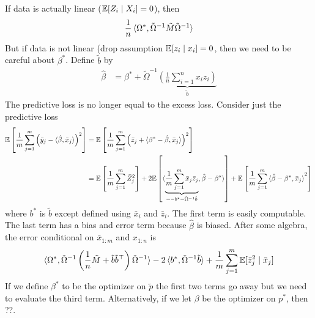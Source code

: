 If data is actually linear ($\mathbb{E}[Z_i \mid X_i] = 0$), then
\begin{align}
  \frac{1}{n} \braket{\Omega^*, \tilde{\Omega}^{-1} \tilde{M} \tilde{\Omega}^{-1}}
\end{align} 
But if data is not linear (drop assumption $\mathbb{E}[z_i \mid x_i] = 0$,
then we need to be careful about $\beta^*$. Define $\tilde{b}$ by
\begin{align}
  \hat{\beta} &=
  \beta^* + \tilde{\Omega}^{-1} \underbrace{\left( \frac{1}{n}  \sum_{i=1}^n x_i z_i \right)}_{\tilde{b}}
\end{align}
The predictive loss is no longer equal to the excess loss.
Consider just the predictive loss
\begin{align}
  \mathbb{E}\left[
    \frac{1}{m}  \sum_{j=1}^m \left(
      \bar{y}_j - \braket{\hat{\beta}, \bar{x}_j}
    \right)^2
  \right]
  &= \mathbb{E}\left[
    \frac{1}{m} \sum_{j=1}^m \left(
      \bar{z}_j + \braket{\beta^* - \hat{\beta}, \bar{x}_j}
    \right)^2
  \right] \\
  &= \mathbb{E}\left[ \frac{1}{m} \sum_{j=1}^m \bar{Z}_j^2 \right]
  + 2 \mathbb{E}\left[ \braket{
      \underbrace{\frac{1}{m} \sum_{j=1}^m \bar{x}_j \bar{z}_j}_{=-b^* = \tilde{\Omega}^{-1} \tilde{b}}
, \hat{\beta} - \beta^*}\right]
  + \mathbb{E}\left[ \frac{1}{m}  \sum_{j=1}^m \braket{\hat{\beta} - \beta^*, \bar{x}_j}^2\right]
\end{align}
where $b^*$ is $\tilde{b}$ except defined using $\bar{x}_i$ and $\bar{z}_i$.
The first term is easily computable. The last
term has a bias and error term because $\hat\beta$ is biased.
After some algebra, the error conditional on
$\bar{x}_{1:m}$ and $x_{1:n}$ is
\begin{align}
  \braket{\Omega^*, \tilde{\Omega}^{-1}\left(
      \frac{1}{n} \tilde{M} + \tilde{b} \tilde{b}^\top
  \right) \tilde{\Omega}^{-1}}
  - 2 \braket{b^*, \tilde{\Omega}^{-1} \tilde{b}}
  + \frac{1}{m} \sum_{j=1}^m \mathbb{E}[\bar{z}_j^2 \mid \bar{x}_j]
\end{align}
If we define $\beta^*$ to be the optimizer on $\tilde{p}$
the first two terms go away but we need to evaluate the third term.
Alternatively, if we let $\beta$ be the optimizer on $p^*$, then ??.
